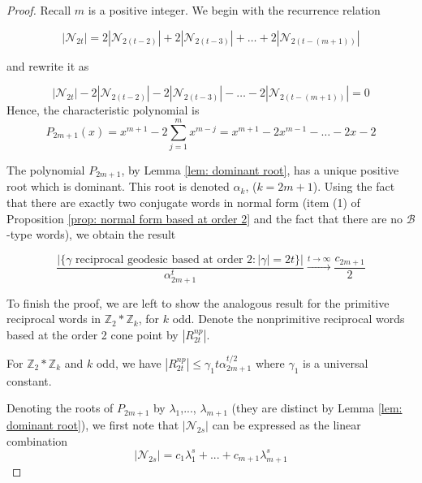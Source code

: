 \documentclass[11pt]{amsart}
\numberwithin{equation}{section}
\theoremstyle{plain}
\begin{document}
   
  \begin{proof} Recall $m$ is a positive integer. 
  We begin with the recurrence relation
  	
  	\begin{equation*}
  	|\mathcal{N}_{2t}| = 2|\mathcal{N}_{2(t-2)}| + 2|\mathcal{N}_{2(t-3)}| + \dots + 2|\mathcal{N}_{2(t-(m+1))}|
  	\end{equation*}
  	
  	and rewrite it as 
  	
  	\begin{equation*}
  	|\mathcal{N}_{2t}| - 2|\mathcal{N}_{2(t-2)}| - 2|\mathcal{N}_{2(t-3)}| - \dots - 2|\mathcal{N}_{2(t-(m+1))}| = 0
  	\end{equation*}
  	Hence,  the characteristic polynomial is
	\begin{equation}
  	P_{2m+1}(x) = x^{m+1}-2\sum_{j=1}^{m} x^{m-j}     
	=x^{m+1} -2x^{m-1} - \dots -2x-2 
  	\end{equation}
	
The polynomial $P_{2m+1}$, by Lemma 
\ref{lem: dominant root}, has a unique positive root which is dominant. This root  is denoted  $\alpha_{k}$, ($k=2m+1$).
 	Using the fact that there are exactly two conjugate words in normal form (item (1) of  Proposition \ref{prop: normal form based at order 2} and the fact that there are no 
	$\mathcal{B}$-type words), we obtain the  result
	
	
	
	
	
	
	
	
	
	
\begin{equation}
\frac{\big|\{\gamma \text{ reciprocal geodesic based at order 2}: |\gamma|=2t\}\big|}
{\alpha_{2m+1}^{t}} \xrightarrow{t\to\infty} \frac{c_{2m+1}}{2}
\end{equation}

To finish the proof, we are left to show  the analogous result for the primitive reciprocal   words  in $\mathbb{Z}_{2} * \mathbb{Z}_{k}$,  for $k$ odd. Denote  the nonprimitive reciprocal words based at the order 2 cone point by $|R_{2t}^{np}|$.
   
    
 \vskip5pt
  
  

  For  $\mathbb{Z}_{2} * \mathbb{Z}_{k}$ and $k$ odd, we have
  	$|R_{2t}^{np}| \leq \gamma_{1} t \alpha_{2m+1}^{t/2}$ 
	where   $\gamma_{1}$ is  a universal constant.
  \vskip5pt
  

 Denoting the roots of 
$P_{2m+1}$  by 
$\lambda_1$,..., $\lambda_{m+1}$ (they are distinct by Lemma \ref{lem: dominant root}), 
we first note that   $|\mathcal{N}_{2s}|$ can be expressed as the  linear combination 
\begin{equation}\label{eq: general solution}
|\mathcal{N}_{2s}|
=c_{1}\lambda_{1}^{s} +...+c_{m+1}\lambda_{m+1}^{s}
\end{equation}


\end{proof}
\end{document}
